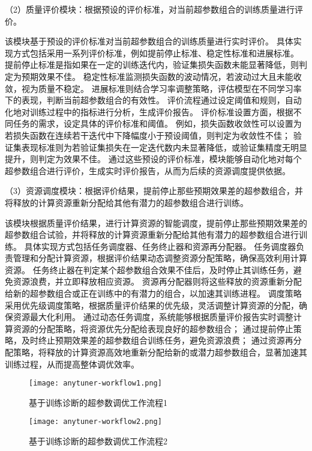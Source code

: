 （2）质量评价模块：根据预设的评价标准，对当前超参数组合的训练质量进行评价。

该模块基于预设的评价标准对当前超参数组合的训练质量进行实时评价。
具体实现方式包括采用一系列评价标准，例如提前停止标准、稳定性标准和进展标准。
提前停止标准是指如果在一定的训练迭代内，验证集损失函数未能显著降低，则判定为预期效果不佳。
稳定性标准监测损失函数的波动情况，若波动过大且未能收敛，视为质量不稳定。
进展标准则结合学习率调整策略，评估模型在不同学习率下的表现，判断当前超参数组合的有效性。
评价流程通过设定阈值和规则，自动化地对训练过程中的指标进行分析，生成评价报告。
评价标准设置方面，根据不同任务的需求，设定具体的评价标准和阈值。
例如，损失函数收敛性可以设置为若损失函数在连续若干迭代中下降幅度小于预设阈值，则判定为收敛性不佳；
验证集表现标准则为若验证集损失在一定迭代数内未显著降低，或验证集精度无明显提升，则判定为效果不佳。
通过这些预设的评价标准，模块能够自动化地对每个超参数组合进行评价，生成实时评价报告，从而为后续的资源调度提供依据。

（3）资源调度模块：根据评价结果，提前停止那些预期效果差的超参数组合，并将释放的计算资源重新分配给其他有潜力的超参数组合进行训练。

该模块根据质量评价结果，进行计算资源的智能调度，提前停止那些预期效果差的超参数组合试验，并将释放的计算资源重新分配给其他有潜力的超参数组合进行训练。
具体实现方式包括任务调度器、任务终止器和资源再分配器。
任务调度器负责管理和分配计算资源，根据评价结果动态调整资源分配策略，确保高效利用计算资源。
任务终止器在判定某个超参数组合效果不佳后，及时停止其训练任务，避免资源浪费，并立即释放相应资源。
资源再分配器则将这些释放的资源重新分配给新的超参数组合或正在训练中的有潜力的组合，以加速其训练进程。
调度策略采用优先级调度策略，根据质量评价结果的优先级，灵活调整计算资源的分配，确保资源最大化利用。
通过动态任务调度，系统能够根据质量评价报告实时调整计算资源的分配策略，将资源优先分配给表现良好的超参数组合；
通过提前停止策略，及时终止预期效果差的超参数组合训练任务，避免资源浪费；
通过资源再分配策略，将释放的计算资源高效地重新分配给新的或潜力超参数组合，显著加速其训练过程，从而提高整体调优效率。

\begin{figure}
  \centering
  \texttt{[image: anytuner-workflow1.png]}
  \caption{基于训练诊断的超参数调优工作流程1}
  \label{fig:anytunerworkflow1}
\end{figure}

\begin{figure}
  \centering
  \texttt{[image: anytuner-workflow2.png]}
  \caption{基于训练诊断的超参数调优工作流程2}
  \label{fig:anytunerworkflow2}
\end{figure}

